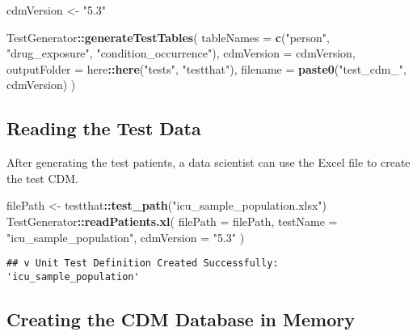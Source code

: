 \documentclass[
]{article}
\newenvironment{Shaded}{\begin{snugshade}}{\end{snugshade}}
\newcommand{\AttributeTok}[1]{\textcolor[rgb]{0.13,0.29,0.53}{#1}}
\newcommand{\FunctionTok}[1]{\textcolor[rgb]{0.13,0.29,0.53}{\textbf{#1}}}
\newcommand{\NormalTok}[1]{#1}
\newcommand{\OtherTok}[1]{\textcolor[rgb]{0.56,0.35,0.01}{#1}}
\newcommand{\SpecialCharTok}[1]{\textcolor[rgb]{0.81,0.36,0.00}{\textbf{#1}}}
\newcommand{\StringTok}[1]{\textcolor[rgb]{0.31,0.60,0.02}{#1}}
\begin{document}
\begin{Shaded}
\begin{Highlighting}[]
\NormalTok{cdmVersion }\OtherTok{\textless{}{-}} \StringTok{"5.3"}

\NormalTok{TestGenerator}\SpecialCharTok{::}\FunctionTok{generateTestTables}\NormalTok{(}
  \AttributeTok{tableNames =} \FunctionTok{c}\NormalTok{(}\StringTok{"person"}\NormalTok{, }\StringTok{"drug\_exposure"}\NormalTok{, }\StringTok{"condition\_occurrence"}\NormalTok{),}
  \AttributeTok{cdmVersion =}\NormalTok{ cdmVersion,}
  \AttributeTok{outputFolder =}\NormalTok{ here}\SpecialCharTok{::}\FunctionTok{here}\NormalTok{(}\StringTok{"tests"}\NormalTok{, }\StringTok{"testthat"}\NormalTok{),}
  \AttributeTok{filename =} \FunctionTok{paste0}\NormalTok{(}\StringTok{"test\_cdm\_"}\NormalTok{, cdmVersion)}
\NormalTok{)}
\end{Highlighting}
\end{Shaded}

\subsection{Reading the Test Data}\label{reading-the-test-data}

After generating the test patients, a data scientist can use the Excel
file to create the test CDM.

\begin{Shaded}
\begin{Highlighting}[]
\NormalTok{filePath }\OtherTok{\textless{}{-}}\NormalTok{ testthat}\SpecialCharTok{::}\FunctionTok{test\_path}\NormalTok{(}\StringTok{"icu\_sample\_population.xlsx"}\NormalTok{)}
\NormalTok{TestGenerator}\SpecialCharTok{::}\FunctionTok{readPatients.xl}\NormalTok{(}
  \AttributeTok{filePath =}\NormalTok{ filePath,}
  \AttributeTok{testName =} \StringTok{"icu\_sample\_population"}\NormalTok{,}
  \AttributeTok{cdmVersion =} \StringTok{"5.3"}
\NormalTok{)}
\end{Highlighting}
\end{Shaded}

\begin{verbatim}
## v Unit Test Definition Created Successfully: 'icu_sample_population'
\end{verbatim}

\subsection{Creating the CDM Database in
Memory}\label{creating-the-cdm-database-in-memory}
\end{document}
